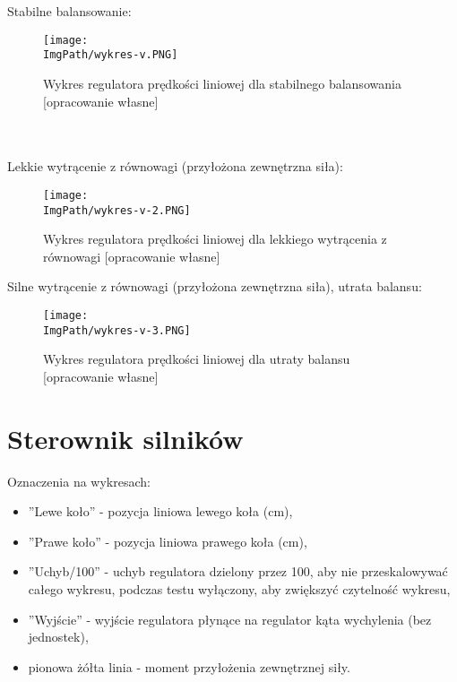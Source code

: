 \documentclass[a4paper,12pt,twoside,openany]{report}
\newcommand{\ImgPath}{.}
\begin{document}
\newpage
\noindent Stabilne balansowanie:
\begin{figure}[!htbp]
	\begin{center}
\centering
\texttt{[image: \\ImgPath/wykres-v.PNG]}
\end{center}
	\caption{Wykres regulatora prędkości liniowej dla stabilnego balansowania [opracowanie własne]}
	\label{schematKomunikacji}
\end{figure}
\\
\\
\noindent Lekkie wytrącenie z równowagi (przyłożona zewnętrzna siła):
\begin{figure}[!htbp]
	\begin{center}
\centering
\texttt{[image: \\ImgPath/wykres-v-2.PNG]}
\end{center}
	\caption{Wykres regulatora prędkości liniowej dla lekkiego wytrącenia z równowagi [opracowanie własne]}
	\label{schematKomunikacji}
\end{figure}

\newpage
\noindent Silne wytrącenie z równowagi (przyłożona zewnętrzna siła), utrata balansu:
\begin{figure}[!htbp]
	\begin{center}
\centering
\texttt{[image: \\ImgPath/wykres-v-3.PNG]}
\end{center}
	\caption{Wykres regulatora prędkości liniowej dla utraty balansu [opracowanie własne]}
	\label{schematKomunikacji}
\end{figure}

\section{Sterownik silników}

\noindent Oznaczenia na wykresach:
\begin{itemize}
\item ''Lewe koło'' - pozycja liniowa lewego koła (cm),
\item ''Prawe koło'' - pozycja liniowa prawego koła (cm),
\item ''Uchyb/100'' - uchyb regulatora dzielony przez 100, aby nie przeskalowywać całego wykresu, podczas testu wyłączony, aby zwiększyć czytelność wykresu,
\item ''Wyjście'' - wyjście regulatora płynące na regulator kąta wychylenia (bez jednostek),
\item pionowa żółta linia - moment przyłożenia zewnętrznej siły.
\end{itemize}
\end{document}
